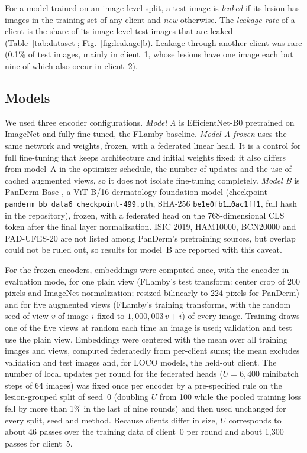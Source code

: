 For a model trained on an image-level split, a test image is \emph{leaked} if its lesion has images in
the training set of any client and \emph{new} otherwise. The \emph{leakage rate} of a client is the
share of its image-level test images that are leaked (Table~\ref{tab:dataset}; Fig.~\ref{fig:leakage}b).
Leakage through another client was rare (0.1\% of test images, mainly in client~1, whose lesions have
one image each but nine of which also occur in client~2).

\subsection{Models}
\label{sec:models}

We used three encoder configurations. \emph{Model A} is EfficientNet-B0 \cite{tan2019efficientnet}
pretrained on ImageNet \cite{deng2009imagenet} and fully fine-tuned, the FLamby baseline. \emph{Model
A-frozen} uses the same network and weights, frozen, with a federated linear head. It is a control for
full fine-tuning that keeps architecture and initial weights fixed; it also differs from model~A in the
optimizer schedule, the number of updates and the use of cached augmented views, so it does not isolate
fine-tuning completely. \emph{Model B} is PanDerm-Base \cite{yan2025panderm}, a ViT-B/16
\cite{dosovitskiy2021vit} dermatology foundation model (checkpoint
\texttt{panderm\_bb\_data6\_checkpoint-499.pth}, SHA-256 \texttt{be1e0fb1\ldots0ac1ff1}, full hash in the
repository), frozen, with a federated head on the 768-dimensional
CLS token after the final layer normalization. ISIC 2019, HAM10000, BCN20000 and PAD-UFES-20 are not
listed among PanDerm's pretraining sources, but overlap could not be ruled out, so results for model~B
are reported with this caveat.

For the frozen encoders, embeddings were computed once, with the encoder in evaluation mode, for one
plain view (FLamby's test transform: center crop of 200 pixels and ImageNet normalization; resized
bilinearly to 224 pixels for PanDerm) and for five augmented views (FLamby's training transforms, with
the random seed of view $v$ of image $i$ fixed to $1{,}000{,}003\,v+i$) of every image. Training draws one
of the five views at random each time an image is used; validation and test use the plain view.
Embeddings were centered with the mean over all training images and views, computed federatedly from
per-client sums; the mean excludes validation and test images and, for LOCO models, the held-out
client. The number of local updates per round for the federated heads ($U=6{,}400$ minibatch steps of 64
images) was fixed once per encoder by a pre-specified rule on the lesion-grouped split of seed~0
(doubling $U$ from 100 while the pooled training loss fell by more than 1\% in the last of nine rounds)
and then used unchanged for every split, seed and method. Because clients differ in size, $U$ corresponds
to about 46 passes over the training data of client~0 per round and about 1,300 passes for client~5.


